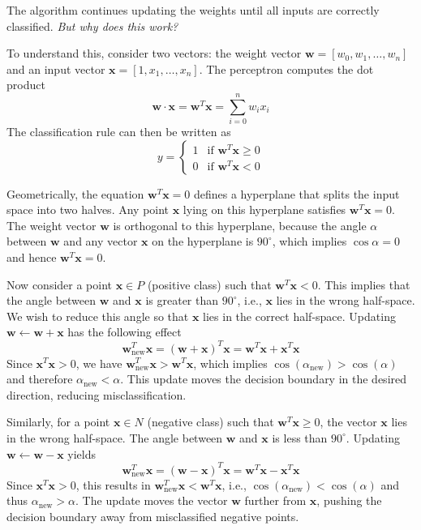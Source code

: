 The algorithm continues updating the weights until all inputs are correctly classified. \textit{But why does this work?}

To understand this, consider two vectors: the weight vector $\mathbf{w} = [w_0, w_1, \ldots, w_n]$ and an input vector $\mathbf{x} = [1, x_1, \ldots, x_n]$. The perceptron computes the dot product 
\[
\mathbf{w} \cdot \mathbf{x} = \mathbf{w}^T \mathbf{x} = \sum_{i=0}^{n} w_i x_i
\]
The classification rule can then be written as 
\[
y =
\begin{cases}
1 & \text{if } \mathbf{w}^T \mathbf{x} \geq 0 \\
0 & \text{if } \mathbf{w}^T \mathbf{x} < 0
\end{cases}
\]

Geometrically, the equation $\mathbf{w}^T \mathbf{x} = 0$ defines a hyperplane that splits the input space into two halves. Any point $\mathbf{x}$ lying on this hyperplane satisfies $\mathbf{w}^T \mathbf{x} = 0$. The weight vector $\mathbf{w}$ is orthogonal to this hyperplane, because the angle $\alpha$ between $\mathbf{w}$ and any vector $\mathbf{x}$ on the hyperplane is $90^\circ$, which implies $\cos \alpha = 0$ and hence $\mathbf{w}^T \mathbf{x} = 0$.

Now consider a point $\mathbf{x} \in P$ (positive class) such that $\mathbf{w}^T \mathbf{x} < 0$. This implies that the angle between $\mathbf{w}$ and $\mathbf{x}$ is greater than $90^\circ$, i.e., $\mathbf{x}$ lies in the wrong half-space. We wish to reduce this angle so that $\mathbf{x}$ lies in the correct half-space. Updating $\mathbf{w} \gets \mathbf{w} + \mathbf{x}$ has the following effect
\[
\mathbf{w}_{\text{new}}^T \mathbf{x} = (\mathbf{w} + \mathbf{x})^T \mathbf{x} = \mathbf{w}^T \mathbf{x} + \mathbf{x}^T \mathbf{x}
\]
Since $\mathbf{x}^T \mathbf{x} > 0$, we have $\mathbf{w}_{\text{new}}^T \mathbf{x} > \mathbf{w}^T \mathbf{x}$, which implies $\cos(\alpha_{\text{new}}) > \cos(\alpha)$ and therefore $\alpha_{\text{new}} < \alpha$. This update moves the decision boundary in the desired direction, reducing misclassification.

Similarly, for a point $\mathbf{x} \in N$ (negative class) such that $\mathbf{w}^T \mathbf{x} \geq 0$, the vector $\mathbf{x}$ lies in the wrong half-space. The angle between $\mathbf{w}$ and $\mathbf{x}$ is less than $90^\circ$. Updating $\mathbf{w} \gets \mathbf{w} - \mathbf{x}$ yields
\[
\mathbf{w}_{\text{new}}^T \mathbf{x} = (\mathbf{w} - \mathbf{x})^T \mathbf{x} = \mathbf{w}^T \mathbf{x} - \mathbf{x}^T \mathbf{x}
\]
Since $\mathbf{x}^T \mathbf{x} > 0$, this results in $\mathbf{w}_{\text{new}}^T \mathbf{x} < \mathbf{w}^T \mathbf{x}$, i.e., $\cos(\alpha_{\text{new}}) < \cos(\alpha)$ and thus $\alpha_{\text{new}} > \alpha$. The update moves the vector $\mathbf{w}$ further from $\mathbf{x}$, pushing the decision boundary away from misclassified negative points.

